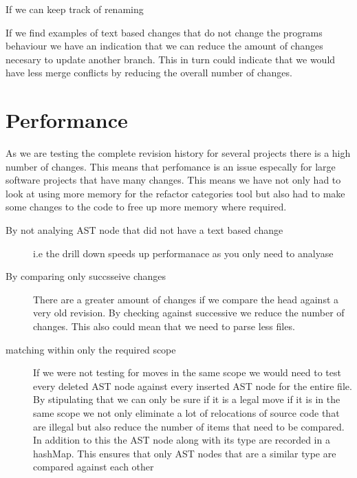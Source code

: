 If we can keep track of renaming 

If we find examples of text based changes that do not change the programs behaviour we have an indication that we can reduce the amount of changes necesary to update another branch. This in turn could indicate that we would have less merge conflicts by reducing the overall number of changes.

\section{Performance}
As we are testing the complete revision history for several projects there is a high number of changes.  This means that perfomance is an issue especally for large software projects that have many changes. This means we have not only had to look at using more memory for the refactor categories tool but also had to make some changes to the code to free up more memory where required.  

\begin{description}

  \item [By not analying AST node that did not have a text based change] 
  i.e the drill down speeds up performanace as you only need to analyase
  \item [By comparing only succsseive changes] 
  There are a greater amount of changes if we compare the head against a very old revision. By checking against successive we reduce the number of changes. This also could mean that we need to parse less files.
  \item [matching within only the required scope]  
  If we were not testing for moves in the same scope we would need to test every deleted AST node against every inserted AST node for the entire file. By stipulating that we can only be sure if it is a legal move if it is in the same scope we not only eliminate a lot of relocations of source code that are illegal but also reduce the number of items that need to be compared. In addition to this the AST node along with its type are recorded in a hashMap.  This ensures that only AST nodes that are a similar type are compared against each other
  
\end{description}

